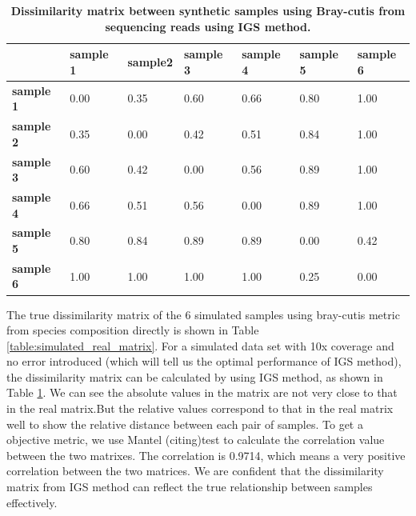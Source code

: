 \begin{table}[h]
\begin{tabular}{|l|l|l|l|l|l|l|}
\hline
                  & \textbf{sample 1} & \textbf{sample2} & \textbf{sample 3} & \textbf{sample 4} & \textbf{sample 5} & \textbf{sample 6} \\ \hline
\textbf{sample 1} & 0.00              & 0.35             & 0.60              & 0.66              & 0.80              & 1.00              \\ \hline
\textbf{sample 2} & 0.35              & 0.00             & 0.42              & 0.51              & 0.84              & 1.00              \\ \hline
\textbf{sample 3} & 0.60              & 0.42             & 0.00              & 0.56              & 0.89              & 1.00              \\ \hline
\textbf{sample 4} & 0.66              & 0.51             & 0.56              & 0.00              & 0.89              & 1.00              \\ \hline
\textbf{sample 5} & 0.80              & 0.84             & 0.89              & 0.89              & 0.00              & 0.42              \\ \hline
\textbf{sample 6} & 1.00              & 1.00             & 1.00              & 1.00              & 0.25              & 0.00              \\ \hline
\end{tabular}
\caption{\bf Dissimilarity matrix between synthetic samples using Bray-cutis
from sequencing reads using IGS method. }
\label{table:simulated_matrix1}
\end{table}


The true dissimilarity matrix of the 6 simulated samples using bray-cutis 
metric from species composition directly is shown in Table \ref{table:simulated_real_matrix}.
For a simulated data set with 10x coverage and no error introduced 
(which will tell us the optimal performance of IGS method), the dissimilarity 
matrix can be calculated by using IGS method, as shown in Table 
\ref{table:simulated_matrix1}. We can see the absolute values in the matrix 
are not very close to that in the real matrix.But the relative values 
correspond to that in the real matrix well to show the relative distance 
between each pair of samples. To get a objective metric, we use 
Mantel (citing)test to calculate the correlation value between the two 
matrixes. The correlation is 0.9714, which means a very positive correlation 
between the two matrices. We are confident that the dissimilarity matrix from IGS method 
can reflect the true relationship between samples effectively.


